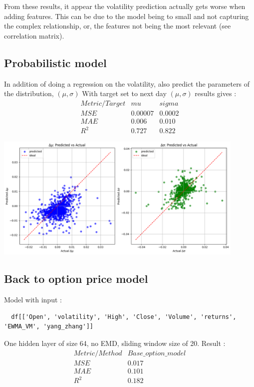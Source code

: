 \documentclass[letterpaper,11pt]{article}
\begin{document}
\bigskip

From these results, it appear the volatility prediction actually gets worse when adding features. This can be due to the model being to small and not capturing the complex relationship, or, the features not being the most relevant (see correlation matrix).


\subsection*{Probabilistic model}
In addition of doing a regression on the volatility, also predict the parameters of the distribution, $(\mu, \sigma)$
With target set to next day $(\mu, \sigma)$ results gives :
\bigskip
\[
\begin{array}{ccc}
Metric/Target & mu & sigma \\
\hline
MSE & 0.00007 & 0.0002\\
MAE & 0.006 & 0.010 \\
R^{2} & 0.727 & 0.822 
\end{array}
\]
\bigskip

  \begin{center}
  \includegraphics[width=0.9\textwidth]{img/mu_sig_pred.png}
  \end{center}




\subsection*{Back to option price model}
Model with input :
\begin{verbatim}
  df[['Open', 'volatility', 'High', 'Close', 'Volume', 'returns', 'EWMA_VM', 'yang_zhang']]
\end{verbatim}

\medskip
\noindent
One hidden layer of size 64, no EMD, sliding window size of 20.
Result :
\bigskip
\[
\begin{array}{cc}
Metric/Method & Base\_option\_model \\
\hline
MSE & 0.017 \\
MAE & 0.101 \\
R^{2} & 0.182  
\end{array}
\]
\end{document}
